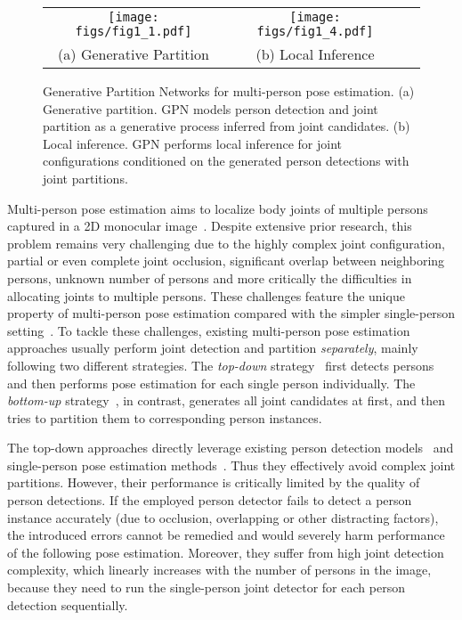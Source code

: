 \documentclass[10pt,twocolumn,letterpaper]{article}
\begin{document}
\begin{figure}[t!]
\begin{center}
\setlength{\tabcolsep}{1.5pt}
\begin{tabular}{ccc}
\texttt{[image: figs/fig1\_1.pdf]} & \texttt{[image: figs/fig1\_4.pdf]} \\
{\fontsize{9pt}{9pt} \selectfont (a) Generative Partition} & {\fontsize{9pt}{9pt} \selectfont (b) Local Inference} \\
\end{tabular}
\vspace{0.5mm}
\caption{Generative Partition Networks for multi-person pose estimation. (a) Generative partition. GPN models person detection and joint partition as a generative process inferred from joint
candidates. (b) Local inference. GPN performs local inference for joint configurations conditioned on the generated person detections with joint partitions.}
\label{fig:fig1}
\end{center}
\end{figure}

Multi-person pose estimation aims to localize body joints of multiple persons captured in a 2D monocular image~\cite{eichner2010we,hpe:deepcut_cvpr16}. Despite extensive prior research, this problem  remains very challenging due to the highly complex joint configuration,  partial or even complete joint occlusion, significant overlap between neighboring persons, unknown number of persons and more critically the difficulties in allocating   joints to multiple persons.
These challenges feature the unique property of multi-person pose estimation compared with the simpler single-person setting~\cite{hpe:hourglass_arxiv15,hpe:conv_pose_machine_arxiv16}. To tackle these challenges, existing multi-person pose estimation approaches usually perform joint detection and  partition \emph{separately}, mainly following two different strategies. The \emph{top-down}
strategy~\cite{eichner2010we,fang16rmpe,iqbal2016multi,papandreou2017towards,pishchulin2012articulated} first detects persons and then performs pose estimation for each single person individually.
The \emph{bottom-up} strategy~\cite{cao2017realtime,insafutdinov2016articulated,hpe:deepercut_eccv16,ladicky2013human,levinkov2017joint,hpe:deepcut_cvpr16}, in contrast, generates all joint candidates
at first, and then tries to partition them to corresponding person instances.

The top-down approaches  directly leverage existing   person detection models~\cite{liu2016ssd,ren2015faster} and single-person pose estimation  methods~\cite{hpe:hourglass_arxiv15,hpe:conv_pose_machine_arxiv16}. Thus they effectively avoid complex  joint partitions.
However, their performance is critically limited by the quality of person detections. If the employed person detector fails to detect a person instance accurately (due to occlusion, overlapping or other distracting factors), the introduced errors cannot be remedied  and would severely harm performance of the following pose estimation. Moreover, they suffer from high  joint detection complexity, which linearly increases with the number of persons in the image, because they need  to run the single-person joint detector for each person detection sequentially.
\end{document}
